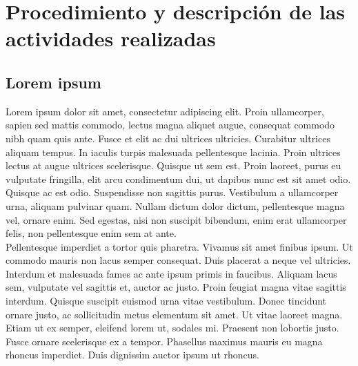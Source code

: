 \documentclass[letterpaper,oneside,openany,11pt]{book}
\begin{document}



\chapter{Procedimiento y descripción de las actividades realizadas}\label{cap.procedimiento}
\section{Lorem ipsum}
\noindent Lorem ipsum dolor sit amet, consectetur adipiscing elit. Proin ullamcorper, sapien sed mattis commodo, lectus magna aliquet augue, consequat commodo nibh quam quis ante. Fusce et elit ac dui ultrices ultricies. Curabitur ultrices aliquam tempus. In iaculis turpis malesuada pellentesque lacinia. Proin ultrices lectus at augue ultrices scelerisque. Quisque ut sem est. Proin laoreet, purus eu vulputate fringilla, elit arcu condimentum dui, ut dapibus nunc est sit amet odio. Quisque ac est odio. Suspendisse non sagittis purus. Vestibulum a ullamcorper urna, aliquam pulvinar quam. Nullam dictum dolor dictum, pellentesque magna vel, ornare enim. Sed egestas, nisi non suscipit bibendum, enim erat ullamcorper felis, non pellentesque enim sem at ante. \\

Pellentesque imperdiet a tortor quis pharetra. Vivamus sit amet finibus ipsum. Ut commodo mauris non lacus semper consequat. Duis placerat a neque vel ultricies. Interdum et malesuada fames ac ante ipsum primis in faucibus. Aliquam lacus sem, vulputate vel sagittis et, auctor ac justo. Proin feugiat magna vitae sagittis interdum. Quisque suscipit euismod urna vitae vestibulum. Donec tincidunt ornare justo, ac sollicitudin metus elementum sit amet. Ut vitae laoreet magna. Etiam ut ex semper, eleifend lorem ut, sodales mi. Praesent non lobortis justo. Fusce ornare scelerisque ex a tempor. Phasellus maximus mauris eu magna rhoncus imperdiet. Duis dignissim auctor ipsum ut rhoncus. \\
\end{document}
